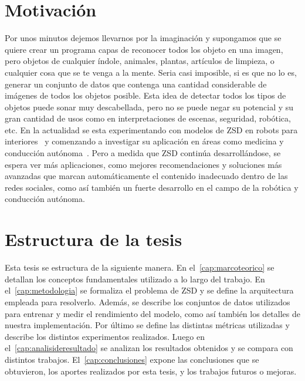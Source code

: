 \section{Motivación} \label{sec:motivacion}

Por unos minutos dejemos llevarnos por la imaginación y supongamos que se quiere crear un programa capas de reconocer todos los objeto en una imagen, pero objetos de cualquier índole, animales, plantas, artículos de limpieza, o cualquier cosa que se te venga a la mente. Seria casi imposible, si es que no lo es, generar un conjunto de datos que contenga una cantidad considerable de imágenes de todos los objetos posible. Esta idea de detectar todos los tipos de objetos puede sonar muy descabellada, pero no se puede negar su potencial y su gran cantidad de usos como en interpretaciones de escenas, seguridad, robótica, etc. En la actualidad se esta experimentando con modelos de ZSD en robots para interiores~\cite{abdalwhab2019zero} y comenzando a investigar su aplicación en áreas como medicina y conducción autónoma~\cite{rezaei2020zero}. Pero a medida que ZSD continúa desarrollándose, se espera ver más aplicaciones, como mejores recomendaciones y soluciones más avanzadas que marcan automáticamente el contenido inadecuado dentro de las redes sociales, como así también un fuerte desarrollo en el campo de la robótica y conducción autónoma.


\section{Estructura de la tesis} \label{sec:estructuradelatesis}

Esta tesis se estructura de la siguiente manera. En el~\autoref{cap:marcoteorico} se detallan los conceptos fundamentales utilizado a lo largo del trabajo. En el~\autoref{cap:metodologia} se formaliza el problema de ZSD y se define la arquitectura empleada para resolverlo. Además, se describe los conjuntos de datos utilizados para entrenar y medir el rendimiento del modelo, como así también los detalles de nuestra implementación. Por último se define las distintas métricas utilizadas y describe los distintos experimentos realizados. Luego en el~\autoref{cap:analisideresultado} se analizan los resultados obtenidos y se compara con distintos trabajos. El~\autoref{cap:conclusiones} expone las conclusiones que se obtuvieron, los aportes realizados por esta tesis, y los trabajos futuros o mejoras.
